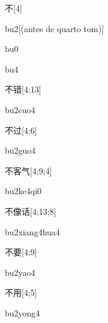\begin{verbete}[bu2]{不}[4]
\begin{pronuncia}[\\]{bu2}[(antes de quarto tom)]
\end{pronuncia}
\begin{pronuncia}{bu0}
\end{pronuncia}
\begin{pronuncia}{bu4}
\end{pronuncia}
\end{verbete}

\begin{verbete}[bu2cuo4]{不错}[4;13]
\begin{pronuncia}{bu2cuo4}
\end{pronuncia}
\end{verbete}

\begin{verbete}[bu2guo4]{不过}[4;6]
\begin{pronuncia}{bu2guo4}
\end{pronuncia}
\end{verbete}

\begin{verbete}[bu2ke4qi0]{不客气}[4;9;4]
\begin{pronuncia}{bu2ke4qi0}
\end{pronuncia}
\end{verbete}

\begin{verbete}{不像话}[4;13;8]
\begin{pronuncia}{bu2xiang4hua4}
\end{pronuncia}
\end{verbete}

\begin{verbete}[bu2yao4]{不要}[4;9]
\begin{pronuncia}{bu2yao4}
\end{pronuncia}
\end{verbete}

\begin{verbete}[bu2yong4]{不用}[4;5]
\begin{pronuncia}{bu2yong4}
\end{pronuncia}
\end{verbete}

